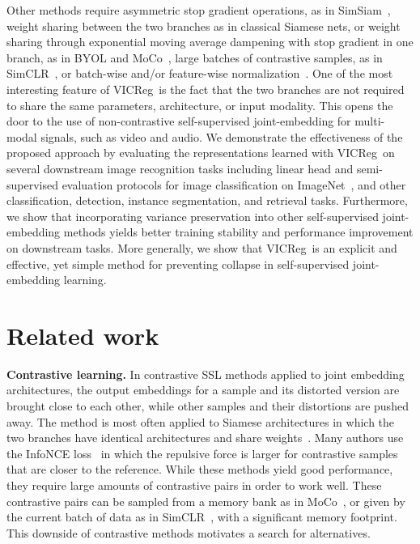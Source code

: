 \documentclass{article}
\newcommand{\algo}{VICReg}
\begin{document}
Other methods require asymmetric stop gradient operations, as in SimSiam~\cite{chen2020simsiam}, weight sharing between the two branches as in classical Siamese nets, or weight sharing through exponential moving average dampening with stop gradient in one branch, as in BYOL and MoCo~\cite{he2020moco, grill2020byol,chen2020mocov2}, large batches of contrastive samples, as in SimCLR~\cite{chen2020simclr}, or batch-wise and/or feature-wise normalization~\cite{caron2020swav, grill2020byol, chen2020simsiam, zbontar2021barlow, ermolov2021whitening}. One of the most interesting feature of \algo \ is the fact that the two branches are not required to share the same parameters, architecture, or input modality. This opens the door to the use of non-contrastive self-supervised joint-embedding for multi-modal signals, such as video and audio. We demonstrate the effectiveness of the proposed approach by evaluating the representations learned with \algo \ on several downstream image recognition tasks including linear head and semi-supervised evaluation protocols for image classification on ImageNet~\cite{deng2009imagenet}, and other classification, detection, instance segmentation, and retrieval tasks. Furthermore, we show that incorporating variance preservation into other self-supervised joint-embedding methods yields better training stability and performance improvement on downstream tasks. More generally, we show that \algo \ is an explicit and effective, yet simple method for preventing collapse in self-supervised joint-embedding learning.

  
\section{Related work}

\noindent \textbf{Contrastive learning.} In contrastive SSL methods applied to joint embedding architectures, the output embeddings for a sample and its distorted version are brought close to each other, while other samples and their distortions are pushed away. The method is most often applied to Siamese architectures in which the two branches have identical architectures and share weights~\cite{misra2020pirl, he2020moco, bromley1994siamese, hjelm2019mutual, chen2020simclr, chen2020mocov2, hadsell2006contrastive, ye2019spreading, wu2018discrimination, oord2018coding, chen2020simclrv2}. Many authors use the InfoNCE loss~\cite{oord2018coding} in which the repulsive force is larger for contrastive samples that are closer to the reference. While these methods yield good performance, they require large amounts of contrastive pairs in order to work well. These contrastive pairs can be sampled from a memory bank as in MoCo~\cite{he2020moco}, or given by the current batch of data as in SimCLR~\cite{chen2020simclr}, with a significant memory footprint. This downside of contrastive methods motivates a search for alternatives.
\end{document}

